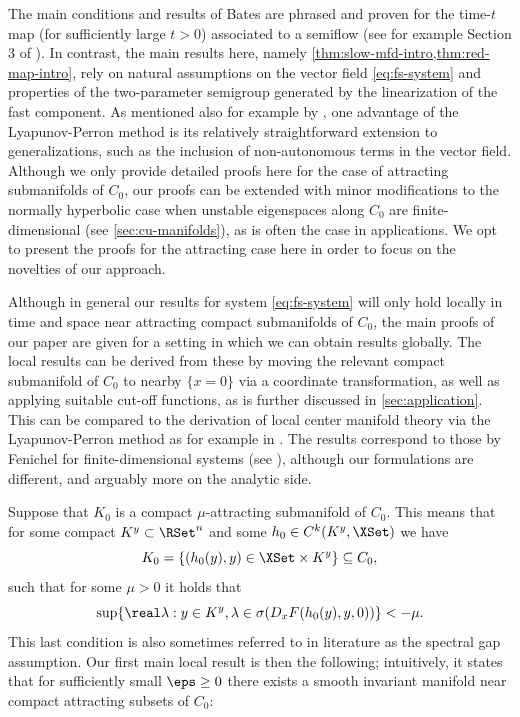 \documentclass[a4paper]{siamart190516}
\begin{document}
The main conditions and results of Bates are phrased and proven for the time-$t$ map 
(for sufficiently large $t  > 0$) associated to a semiflow (see for example Section 3 
of \cite{BaLuZe98}). In contrast, the main results here, namely
\cref{thm:slow-mfd-intro,thm:red-map-intro},
rely on natural assumptions on the vector field \cref{eq:fs-system} and properties
of the two-parameter
semigroup generated by the linearization of the fast component. As mentioned also for example by \cite{El12},
one advantage of the Lyapunov-Perron method is its relatively straightforward extension to generalizations,
such as the inclusion of non-autonomous terms in the vector field. Although we only provide detailed proofs here for the case of
attracting submanifolds of $C_0$, our proofs can be extended with minor modifications to the normally hyperbolic case 
when unstable eigenspaces along $C_0$ are finite-dimensional (see \cref{sec:cu-manifolds}), as is often the case in applications. We opt to present 
the proofs for the attracting case here in order to focus on the novelties of our approach.

Although in general our results for system \cref{eq:fs-system} will only hold locally in time and space near attracting
 compact submanifolds of $C_0$, the main proofs of our paper are given for a setting in which we can
 obtain results globally. The local results can be derived from these by moving the relevant compact submanifold of 
 $C_0$ to nearby $\{ x = 0 \}$  via a coordinate transformation, as well as applying suitable cut-off functions, as is further 
 discussed in \cref{sec:application}.  This can be compared to the derivation of local center manifold theory 
 via the Lyapunov-Perron method as for example in \cite{HaIo10}. The results correspond to those by Fenichel for 
 finite-dimensional systems (see \cite{Fe79, Ku15}), although our formulations are different, and arguably more 
 on the analytic side. 

Suppose that $K_0$ is a compact $\mu$-attracting submanifold of $C_0$. 
This means that  for some compact $K^y \subset \RSet^n$ and some  $h_0 \in C^k(K^y, \XSet)$ we have
\[
K_0 = \{ (h_0(y),y) \in \XSet \times K^y  \} \subseteq C_0,
\]
such that for some $\mu > 0$ it holds that
\[
 \sup \{ \real \lambda : y \in K^y, \lambda  \in \sigma(D_x F(h_0(y),y,0)) \} < -\mu. 
\]
This last condition is also sometimes referred to in literature as the spectral gap assumption.
Our first main local result is then the following; intuitively, it states that for sufficiently small $\eps \geq 0$ 
there exists a smooth invariant manifold near compact attracting subsets of $C_0$:
\end{document}
